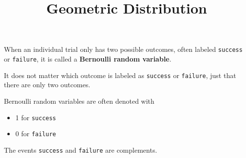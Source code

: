 \documentclass{beamer}
\title[MA205 - Section 4.2]{Geometric Distribution}
\begin{document}
\begin{frame}
\titlepage
\end{frame}

\begin{frame}
  \begin{definition}
    When an individual trial only has two possible outcomes, often labeled \texttt{success} or \texttt{failure}, it is called a \textbf{Bernoulli random variable}.
  \end{definition}\pause

  \begin{note}
    It does not matter which outcome is labeled as \texttt{success} or \texttt{failure}, just that there are only two outcomes.
  \end{note}\pause

  \begin{note}
    Bernoulli random variables are often denoted with
    \begin{itemize}
    \item 1 for \texttt{success}
    \item 0 for \texttt{failure}
    \end{itemize}
  \end{note}\pause

  \begin{note}
    The events \texttt{success} and \texttt{failure} are complements.
  \end{note}
\end{frame}
\end{document}
